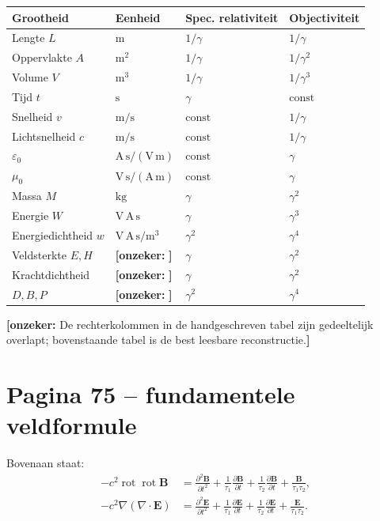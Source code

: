 \documentclass[11pt,a4paper]{article}
\newcommand{\onzeker}[1]{\ifmmode\text{\color{red!70!black}\bfseries[onzeker]}\else\textcolor{red!70!black}{\textbf{[onzeker:} #1\textbf{]}}\fi}
\newcommand{\vect}[1]{\mathbf{#1}}
\newcommand{\rot}{\operatorname{rot}}
\begin{document}
\begin{longtable}{llll}
\toprule
\textbf{Grootheid} & \textbf{Eenheid} & \textbf{Spec. relativiteit} & \textbf{Objectiviteit}\\
\midrule
Lengte $L$ & $\mathrm{m}$ & $1/\gamma$ & $1/\gamma$\\
Oppervlakte $A$ & $\mathrm{m^2}$ & $1/\gamma$ & $1/\gamma^{2}$\\
Volume $V$ & $\mathrm{m^3}$ & $1/\gamma$ & $1/\gamma^{3}$\\
Tijd $t$ & $\mathrm{s}$ & $\gamma$ & $\mathrm{const}$\\
Snelheid $v$ & $\mathrm{m/s}$ & $\mathrm{const}$ & $1/\gamma$\\
Lichtsnelheid $c$ & $\mathrm{m/s}$ & $\mathrm{const}$ & $1/\gamma$\\
$\varepsilon_0$ & $\mathrm{A\,s/(V\,m)}$ & $\mathrm{const}$ & $\gamma$\\
$\mu_0$ & $\mathrm{V\,s/(A\,m)}$ & $\mathrm{const}$ & $\gamma$\\
Massa $M$ & $\mathrm{kg}$ & $\gamma$ & $\gamma^{2}$\\
Energie $W$ & $\mathrm{V\,A\,s}$ & $\gamma$ & $\gamma^{3}$\\
Energiedichtheid $w$ & $\mathrm{V\,A\,s/m^{3}}$ & $\gamma^{2}$ & $\gamma^{4}$\\
Veldsterkte $E,H$ & \onzeker{} & $\gamma$ & $\gamma^{2}$\\
Krachtdichtheid & \onzeker{} & $\gamma$ & $\gamma^{2}$\\
$D,B,P$ & \onzeker{} & $\gamma^{2}$ & $\gamma^{4}$\\
\bottomrule
\end{longtable}

\onzeker{De rechterkolommen in de handgeschreven tabel zijn gedeeltelijk overlapt; bovenstaande tabel is de best leesbare reconstructie.}

\section*{Pagina 75 -- fundamentele veldformule}

Bovenaan staat:
\begin{align*}
-c^{2}\rot\rot\vect{B}
&=
\frac{\partial^{2}\vect{B}}{\partial t^{2}}
+
\frac{1}{\tau_1}\frac{\partial\vect{B}}{\partial t}
+
\frac{1}{\tau_2}\frac{\partial\vect{B}}{\partial t}
+
\frac{\vect{B}}{\tau_1\tau_2},\\
-c^{2}\nabla(\nabla\cdot\vect{E})
&=
\frac{\partial^{2}\vect{E}}{\partial t^{2}}
+
\frac{1}{\tau_1}\frac{\partial\vect{E}}{\partial t}
+
\frac{1}{\tau_2}\frac{\partial\vect{E}}{\partial t}
+
\frac{\vect{E}}{\tau_1\tau_2}.
\end{align*}
\end{document}
